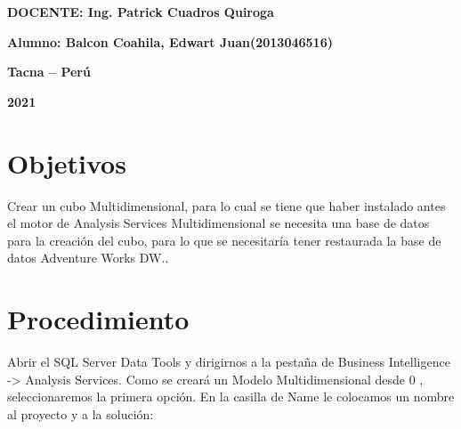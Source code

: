 \documentclass{article}
\begin{document}
\begin{titlepage}
\begin{center}
\vspace*{0.3in}
\begin{Large}
\textbf{DOCENTE: Ing. Patrick Cuadros Quiroga} \\
\end{Large}

\vspace*{0.2in}
\vspace*{0.1in}
\begin{large}

\begin{Large}
\textbf{Alumno: Balcon Coahila, Edwart Juan\hfill	(2013046516) } \\
\end{Large}

\vspace*{0.15in}
\begin{Large}
\textbf{Tacna – Perú} \\
\end{Large}

\vspace*{0.05in}
\begin{Large}
\textbf{2021 } \\
\end{Large}

\end{large}
\end{center}

\end{titlepage}



\section{Objetivos}
Crear un cubo Multidimensional, para lo cual se tiene que haber instalado antes el motor de Analysis
Services Multidimensional se necesita una base de datos para la creación del cubo, para lo que se
necesitaría tener restaurada la base de datos Adventure Works DW..




\section{Procedimiento}

Abrir el SQL Server Data Tools y dirigirnos a la pestaña de Business Intelligence -> Analysis
Services. Como se creará un Modelo Multidimensional desde 0 , seleccionaremos la primera opción. En la
casilla de Name le colocamos un nombre al proyecto y a la solución:












\end{document}
